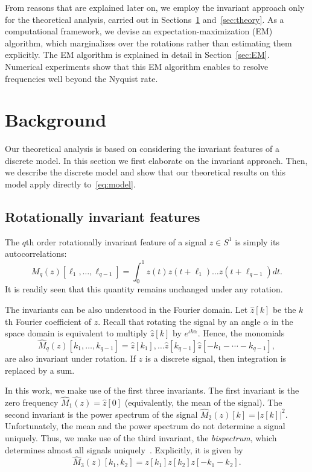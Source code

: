 \documentclass[english,12pt]{article}
\newcommand{\I}{\iota}
\numberwithin{equation}{section}
\numberwithin{thm}{section} %
\begin{document}
From reasons that are explained later on, we employ the invariant approach only for the theoretical analysis, carried out in Sections~\ref{sec:background} and~\ref{sec:theory}. As a computational framework, we devise an expectation-maximization (EM) algorithm, which marginalizes over the rotations rather than estimating them explicitly.  The EM algorithm is explained in detail in Section~\ref{sec:EM}.
Numerical experiments show that this EM algorithm enables to resolve frequencies well beyond the Nyquist rate.

\section{Background} \label{sec:background}

Our theoretical analysis is based on considering the invariant features of a discrete model. In this section we first elaborate on the invariant approach. Then, we describe the discrete model and show that our theoretical results on this model apply directly to~\eqref{eq:model}.

\subsection{Rotationally invariant features} \label{sec:invariants}

The $q$th order rotationally invariant feature of a signal $z\in S^1$ is simply its autocorrelations:
\begin{equation}
M_q(z)[\ell_1,\ldots,\ell_{q-1}]=\int_{0}^1 z(t)z(t+\ell_1)\ldots z(t+\ell_{q-1})dt.
\end{equation} 
It is readily seen that this quantity remains unchanged under any rotation. 

The invariants  can be also understood in the Fourier domain.
Let ${\hat{z}[k]}$ be the $k$th Fourier coefficient of $z$. Recall that rotating the signal by an angle $\alpha$ in the space domain is equivalent to multiply ${\hat{z}[k]}$ by $e^{\I k\alpha}$. Hence, the monomials
\begin{equation}
\hat{M}_q(z)[k_1,\ldots,k_{q-1}]=\hat{z}[k_1],\ldots \hat{z}[k_{q-1}]{\hat{z}[-k_1-\cdots-k_{q-1}]},
\end{equation} 
are also invariant under rotation. If $z$ is a discrete signal, then integration is replaced by a sum.

In this work, we make use of the first three invariants. The first invariant is the zero frequency $\hat{M}_1(z) = \hat{z}[0]$ (equivalently, the mean of the signal). The second invariant is the power spectrum of the signal $\hat{M}_2(z)[k]=|z[k]|^2$. Unfortunately, the mean and the power spectrum do not determine a signal uniquely. 
Thus, we make use of the third invariant, the \emph{bispectrum}, which determines almost all signals uniquely~\cite{tukey1953spectral,sadler1992shift}. Explicitly, it is given by
\begin{equation}
\hat{M}_3(z)[k_1,k_2] = z[k_1]z[k_2]z[-k_1-k_2].
\end{equation}
\end{document}
